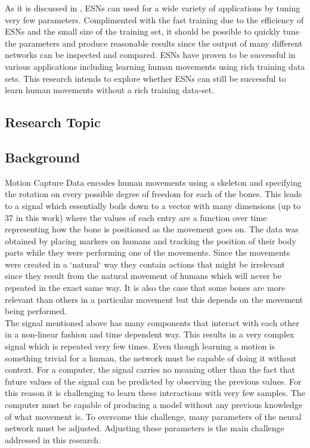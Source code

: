 \documentclass[letterpaper,9pt]{article}
\begin{document}
As it is discussed in \cite{ESNVerstraeten}, ESNs can used for a wide variety of applications by tuning very few parameters. Complimented with the fast training due to the efficiency of ESNs \cite{Jaeger05TrainingRRN} and the small size of the training set, it should be possible to quickly tune the parameters and produce reasonable results since the output of many different networks can be inspected and compared. ESNs have proven to be successful in various applications including learning human movements using rich training data sets. This research intends to explore whether ESNs can still be successful to learn human movements without a rich training data-set.



\subsection{Research Topic}

\subsection{Background}

Motion Capture Data encodes human movements using a skeleton and specifying the rotation on every possible degree of freedom for each of the bones. This leads to a signal which essentially boils down to a vector with many dimensions (up to 37 in this work) where the values of each entry are a function over time representing how the bone is positioned as the movement goes on. The data was obtained by placing markers on humans and tracking the position of their body parts while they were performing one of the movements. Since the movements were created in a `natural` way they contain actions that might be irrelevant since they result from the natural movement of humans which will never be repeated in the exact same way. It is also the case that some bones are more relevant than others in a particular movement but this depends on the movement being performed.\\

The signal mentioned above has many components that interact with each other in a non-linear fashion and time dependent way. This results in a very complex signal which is repeated very few times. Even though learning a motion is something trivial for a human, the network must be capable of doing it without context. For a computer, the signal carries no meaning other than the fact that future values of the signal can be predicted by observing the previous values. For this reason it is challenging to learn these interactions with very few samples. The computer must be capable of producing a model without any previous knowledge of what movement is. To overcome this challenge, many parameters of the neural network must be adjusted. Adjusting these parameters is the main challenge addressed in this research.\\
\end{document}
